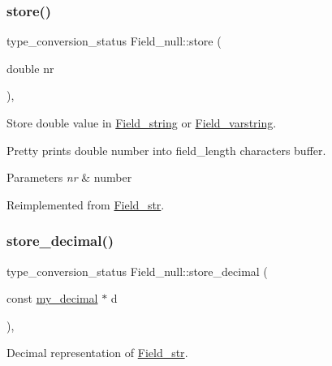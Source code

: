 \mbox{\label{classField__null_a396499b751f2dd051b816a3953943d2b}} 
\subsubsection{\texorpdfstring{store()}{store()}}
{\footnotesize\ttfamily type\+\_\+conversion\+\_\+status Field\+\_\+null\+::store (\begin{DoxyParamCaption}\item[{double}]{nr }\end{DoxyParamCaption})\hspace{0.3cm}{\ttfamily [inline]}, {\ttfamily [virtual]}}

Store double value in \mbox{\hyperlink{classField__string}{Field\+\_\+string}} or \mbox{\hyperlink{classField__varstring}{Field\+\_\+varstring}}.

Pretty prints double number into field\+\_\+length characters buffer.


\begin{DoxyParams}{Parameters}
{\em nr} & number \\
\hline
\end{DoxyParams}


Reimplemented from \mbox{\hyperlink{classField__str_ad4b48698ff57cae15a2df92f1145b102}{Field\+\_\+str}}.

\mbox{\label{classField__null_a67a8c81f634b920257aff8736ad6e00e}} 
\subsubsection{\texorpdfstring{store\+\_\+decimal()}{store\_decimal()}}
{\footnotesize\ttfamily type\+\_\+conversion\+\_\+status Field\+\_\+null\+::store\+\_\+decimal (\begin{DoxyParamCaption}\item[{const \mbox{\hyperlink{classmy__decimal}{my\+\_\+decimal}} $\ast$}]{d }\end{DoxyParamCaption})\hspace{0.3cm}{\ttfamily [inline]}, {\ttfamily [virtual]}}

Decimal representation of \mbox{\hyperlink{classField__str}{Field\+\_\+str}}.


